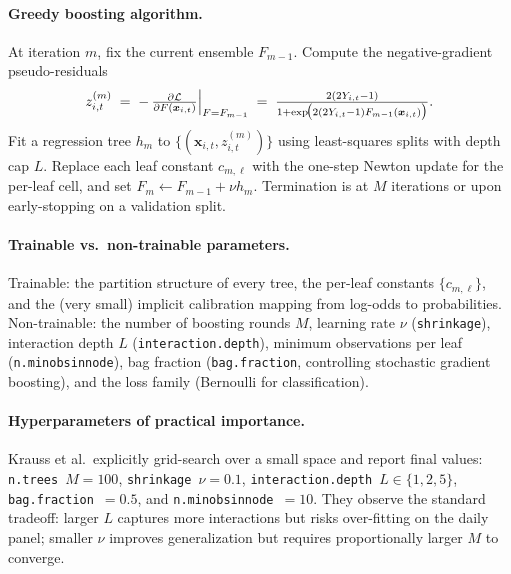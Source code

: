 \documentclass[11pt]{article}
\begin{document}
\paragraph{Greedy boosting algorithm.}  At iteration $m$, fix the current ensemble $F_{m-1}$.  Compute the negative-gradient pseudo-residuals
\[
    z_{i,t}^{(m)} \;=\; -\,\Bigl. \tfrac{\partial \mathcal{L}}{\partial F(\bm{x}_{i,t})} \Bigr\rvert_{F = F_{m-1}} \;=\; \tfrac{2(2Y_{i,t}-1)}{1 + \exp\!\bigl( 2(2Y_{i,t}-1) F_{m-1}(\bm{x}_{i,t}) \bigr)}.
\]
Fit a regression tree $h_m$ to $\{(\bm{x}_{i,t}, z_{i,t}^{(m)})\}$ using least-squares splits with depth cap $L$.  Replace each leaf constant $c_{m,\ell}$ with the one-step Newton update for the per-leaf cell, and set $F_m \leftarrow F_{m-1} + \nu h_m$.  Termination is at $M$ iterations or upon early-stopping on a validation split.

\paragraph{Trainable vs.\ non-trainable parameters.}  Trainable: the partition structure of every tree, the per-leaf constants $\{c_{m,\ell}\}$, and the (very small) implicit calibration mapping from log-odds to probabilities.  Non-trainable: the number of boosting rounds $M$, learning rate $\nu$ (\texttt{shrinkage}), interaction depth $L$ (\texttt{interaction.depth}), minimum observations per leaf (\texttt{n.minobsinnode}), bag fraction (\texttt{bag.fraction}, controlling stochastic gradient boosting), and the loss family (Bernoulli for classification).

\paragraph{Hyperparameters of practical importance.}  Krauss et al.\ explicitly grid-search over a small space and report final values: \texttt{n.trees}~$M = 100$, \texttt{shrinkage}~$\nu = 0.1$, \texttt{interaction.depth}~$L \in \{1,2,5\}$, \texttt{bag.fraction}~$ = 0.5$, and \texttt{n.minobsinnode}~$= 10$.  They observe the standard tradeoff: larger $L$ captures more interactions but risks over-fitting on the daily panel; smaller $\nu$ improves generalization but requires proportionally larger $M$ to converge.
\end{document}
